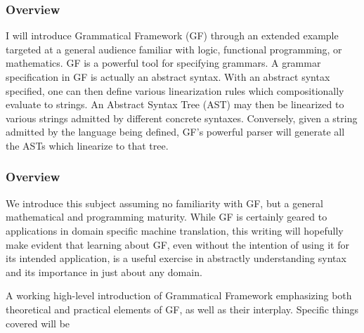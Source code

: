\documentclass[11pt, a4paper]{article}
\begin{document}
\subsubsection{Overview}

I will introduce Grammatical Framework (GF) through an extended example targeted
at a general audience familiar with logic, functional programming, or
mathematics. GF is a powerful tool for specifying grammars. A grammar
specification in GF is actually an abstract syntax. With an abstract syntax
specified, one can then define various linearization rules which compositionally
evaluate to strings. An Abstract Syntax Tree (AST) may then be linearized to
various strings admitted by different concrete syntaxes. Conversely, given a
string admitted by the language being defined, GF's powerful parser will
generate all the ASTs which linearize to that tree.

\subsubsection{Overview} %

We introduce this subject assuming no familiarity with GF, but a general
mathematical and programming maturity. While GF is certainly geared to
applications in domain specific machine translation, this writing will hopefully
make evident that learning about GF, even without the intention of using it for
its intended application, is a useful exercise in abstractly understanding
syntax and its importance in just about any domain.

A working high-level introduction of Grammatical Framework emphasizing both
theoretical and practical elements of GF, as well as their interplay. Specific
things covered will be
\end{document}
